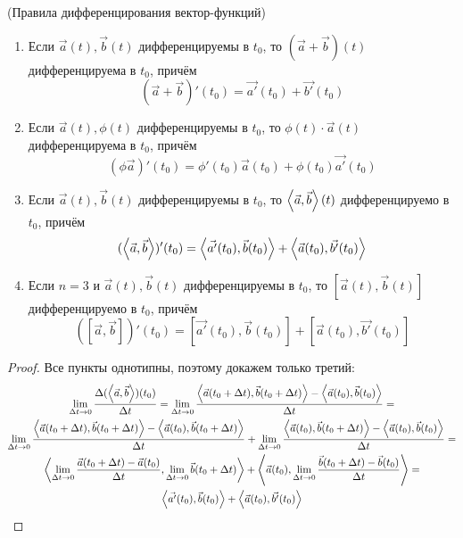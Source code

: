 \begin{lemma} (Правила дифференцирования вектор-функций)
	\begin{enumerate}
		\item Если $\vec{a}(t), \vec{b}(t)$ дифференцируемы в $t_0$, то $(\vec{a} + \vec{b})(t)$ дифференцируема в $t_0$, причём
		\[
			(\vec{a} + \vec{b})'(t_0) = \vec{a'}(t_0) + \vec{b'}(t_0)
		\]
		
		\item Если $\vec{a}(t), \phi(t)$ дифференцируемы в $t_0$, то $\phi(t) \cdot \vec{a}(t)$ дифференцируема в $t_0$, причём
		\[
			(\phi\vec{a})'(t_0) = \phi'(t_0)\vec{a}(t_0) + \phi(t_0)\vec{a'}(t_0)
		\]
		
		\item Если $\vec{a}(t), \vec{b}(t)$ дифференцируемы в $t_0$, то $\left\langle\vec{a}, \vec{b}\right\rangle(t)$ дифференцируемо в $t_0$, причём
		\[
			(\left\langle\vec{a}, \vec{b}\right\rangle)'(t_0) = \left\langle\vec{a'}(t_0), \vec{b}(t_0)\right\rangle + \left\langle\vec{a}(t_0), \vec{b'}(t_0)\right\rangle
		\]
		
		\item Если $n = 3$ и $\vec{a}(t), \vec{b}(t)$ дифференцируемы в $t_0$, то $[\vec{a}(t), \vec{b}(t)]$ дифференцируемо в $t_0$, причём
		\[
			([\vec{a}, \vec{b}])'(t_0) = [\vec{a'}(t_0), \vec{b}(t_0)] + [\vec{a}(t_0), \vec{b'}(t_0)]
		\]
	\end{enumerate}
\end{lemma}

\begin{proof}
	Все пункты однотипны, поэтому докажем только третий:
	\begin{multline*}
		\lim\limits_{\Delta t \to 0} \frac{\Delta (\left\langle\vec{a}, \vec{b}\right\rangle)(t_0)}{\Delta t} = \lim\limits_{\Delta t \to 0} \frac{\left\langle\vec{a}(t_0 + \Delta t), \vec{b}(t_0 + \Delta t)\right\rangle - \left\langle\vec{a}(t_0), \vec{b}(t_0)\right\rangle}{\Delta t} =
		\\
		\lim\limits_{\Delta t \to 0} \frac{\left\langle\vec{a}(t_0 + \Delta t), \vec{b}(t_0 + \Delta t)\right\rangle - \left\langle\vec{a}(t_0), \vec{b}(t_0 + \Delta t)\right\rangle}{\Delta t} + \lim\limits_{\Delta t \to 0} \frac{\left\langle\vec{a}(t_0), \vec{b}(t_0 + \Delta t)\right\rangle - \left\langle\vec{a}(t_0), \vec{b}(t_0)\right\rangle}{\Delta t} =
		\\
		\left\langle\lim\limits_{\Delta t \to 0} \frac{\vec{a}(t_0 + \Delta t) - \vec{a}(t_0)}{\Delta t}, \lim\limits_{\Delta t \to 0} \vec{b}(t_0 + \Delta t)\right\rangle + \left\langle\vec{a}(t_0), \lim\limits_{\Delta t \to 0} \frac{\vec{b}(t_0 + \Delta t) - \vec{b}(t_0)}{\Delta t}\right\rangle = 
		\\
		\left\langle\vec{a'}(t_0), \vec{b}(t_0)\right\rangle + \left\langle\vec{a}(t_0), \vec{b'}(t_0)\right\rangle
	\end{multline*}
\end{proof}


